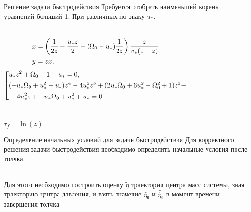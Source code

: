 \documentclass[10pt]{beamer}
\begin{document}
\begin{frame}{Решение задачи быстродействия}
	Требуется отобрать наименьший корень уравнений больший 1. При различных по знаку $u_*$.
	
		\begin{columns}
			\begin{equation}\label{koshisystem}
				 {\begin{aligned}
					& x=\left( \frac{1}{2z}-\frac{u_*z}{2}-(\Omega_0-u_*)\frac{1}{2z}\right)\frac{z}{u_*(1-z)} \hfill	\\
					& y=zx, \hfill                                                                                              \\
			   \end{aligned}}
			\end{equation}
			\begin{equation}\label{koshisystem}
				\left[ {\begin{aligned}
					& u_*z^2+\Omega _0-1-u_*=0, \hfill    \\
					& (-u_* \Omega _0+u_*^2-u_*)z^4-4 u_*^2z^3+(2 u_* \Omega _0+6 u_*^2-\Omega _0^2+1)z^2- \hfill \\
					& -4 u_*^2z+-u_* \Omega _0+u_*^2+u_*=0                                                                                           \\
			   \end{aligned}} \right.
			\end{equation}
		\end{columns}
		$\tau_f=\ln(z)$

\end{frame}

\begin{frame}{Определение начальных условий для задачи быстродействия}
	Для корректного решения задачи быстродействия необходимо определить начальные условия после толчка.
	
	\hfill \\
	Для этого необходимо построить оценку $\tilde{\eta}$ траектории центра масс системы, зная траекторию центра давления,
	и взять значение $\tilde{\eta_0}$ и $\tilde{\dot{\eta_0}}$ в момент времени завершения толчка

\end{frame}
\end{document}
